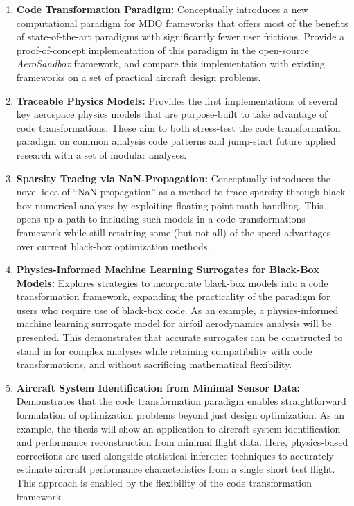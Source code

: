 \begin{enumerate}
    \item \textbf{Code Transformation Paradigm:} Conceptually introduces a new computational paradigm for MDO frameworks that offers most of the benefits of state-of-the-art paradigms with significantly fewer user frictions. Provide a proof-of-concept implementation of this paradigm in the open-source \textit{AeroSandbox} \cite{sharpe_aerosandbox_2021} framework, and compare this implementation with existing frameworks on a set of practical aircraft design problems.
    \item \textbf{Traceable Physics Models:} Provides the first implementations of several key aerospace physics models that are purpose-built to take advantage of code transformations. These aim to both stress-test the code transformation paradigm on common analysis code patterns and jump-start future applied research with a set of modular analyses.
    \item \textbf{Sparsity Tracing via NaN-Propagation:} Conceptually introduces the novel idea of ``NaN-propagation'' as a method to trace sparsity through black-box numerical analyses by exploiting floating-point math handling. This opens up a path to including such models in a code transformations framework while still retaining some (but not all) of the speed advantages over current black-box optimization methods.
    \item \textbf{Physics-Informed Machine Learning Surrogates for Black-Box Models:} Explores strategies to incorporate black-box models into a code transformation framework, expanding the practicality of the paradigm for users who require use of black-box code. As an example, a physics-informed machine learning surrogate model for airfoil aerodynamics analysis will be presented. This demonstrates that accurate surrogates can be constructed to stand in for complex analyses while retaining compatibility with code transformations, and without sacrificing mathematical flexibility.
    \item \textbf{Aircraft System Identification from Minimal Sensor Data:} Demonstrates that the code transformation paradigm enables straightforward formulation of optimization problems beyond just design optimization. As an example, the thesis will show an application to aircraft system identification and performance reconstruction from minimal flight data. Here, physics-based corrections are used alongside statistical inference techniques to accurately estimate aircraft performance characteristics from a single short test flight. This approach is enabled by the flexibility of the code transformation framework.

\end{enumerate}
